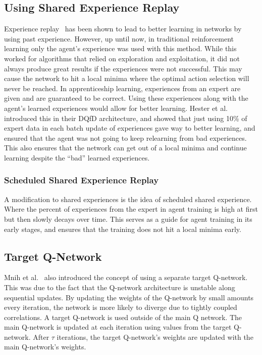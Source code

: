 \documentclass[12pt,american]{report}
\begin{document}
\subsection{Using Shared Experience Replay}
Experience replay~\cite{atari} has been shown to lead to better learning in networks by using past experience.  However, up until now, in traditional reinforcement learning only the agent's experience was used with this method.  While this worked for algorithms that relied on exploration and exploitation, it did not always produce great results if the experiences were not successful. This may cause the network to hit a local minima where the optimal action selection will never be reached. In apprenticeship learning, experiences from an expert are given and are guaranteed to be correct.  Using these experiences along with the agent's learned experiences would allow for better learning.  Hester et al.~\cite{hester2017learning} introduced this in their DQfD architecture, and showed that just using 10\% of expert data in each batch update of experiences gave way to better learning, and ensured that the agent was not going to keep relearning from bad experiences.  This also ensures that the network can get out of a local minima and continue learning despite the ``bad'' learned experiences.
\subsubsection{Scheduled Shared Experience Replay}
A modification to shared experiences is the idea of scheduled shared experience.  Where the percent of experiences from the expert in agent training is high at first but then slowly decays over time.  This serves as a guide for agent training in its early stages, and ensures that the training does not hit a local minima early. 


\subsection{Target Q-Network}
Mnih et al.~\cite{atari} also introduced the concept of using a separate target Q-network.  This was due to the fact that the Q-network architecture is unstable along sequential updates.  By updating the weights of the Q-network by small amounts every iteration, the network is more likely to diverge due to tightly coupled correlations.  A target Q-network is used outside of the main Q network.  The main Q-network is updated at each iteration using values from the target Q-network.  After $\tau$ iterations, the target Q-network's weights are updated with the main Q-network's weights. 
\end{document}
